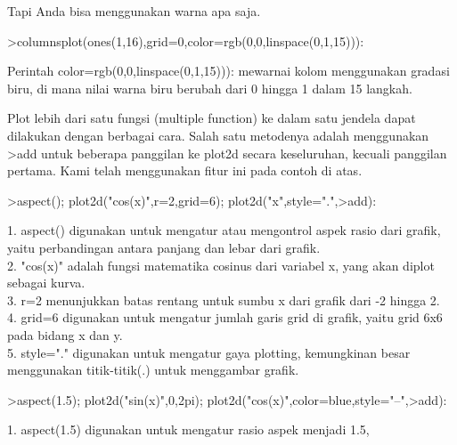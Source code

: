 \documentclass{article}
\begin{document}
\begin{eulernotebook}
\begin{eulercomment}
\begin{eulercomment}
\begin{eulercomment}
\begin{eulercomment}
\begin{eulercomment}
\begin{eulercomment}
\begin{eulercomment}
\begin{eulercomment}
\begin{eulercomment}
Tapi Anda bisa menggunakan warna apa saja.
\end{eulercomment}
\begin{eulerprompt}
>columnsplot(ones(1,16),grid=0,color=rgb(0,0,linspace(0,1,15))):
\end{eulerprompt}
\begin{eulercomment}
Perintah color=rgb(0,0,linspace(0,1,15))): mewarnai kolom menggunakan
gradasi biru, di mana nilai warna biru berubah dari 0 hingga 1 dalam
15 langkah.

\begin{eulercomment}
\begin{eulercomment}
Plot lebih dari satu fungsi (multiple function) ke dalam satu jendela
dapat dilakukan dengan berbagai cara. Salah satu metodenya adalah
menggunakan \textgreater{}add untuk beberapa panggilan ke plot2d secara
keseluruhan, kecuali panggilan pertama. Kami telah menggunakan fitur
ini pada contoh di atas.
\end{eulercomment}
\begin{eulerprompt}
>aspect(); plot2d("cos(x)",r=2,grid=6); plot2d("x",style=".",>add):
\end{eulerprompt}
\begin{eulercomment}
1. aspect() digunakan untuk mengatur atau mengontrol aspek rasio dari
grafik, yaitu perbandingan antara panjang dan lebar dari grafik.\\
2. "cos(x)" adalah fungsi matematika cosinus dari variabel x, yang
akan diplot sebagai kurva.\\
3. r=2 menunjukkan batas rentang untuk sumbu x dari grafik dari -2
hingga 2.\\
4. grid=6 digunakan untuk mengatur jumlah garis grid di grafik, yaitu
grid 6x6 pada bidang x dan y.\\
5. style="." digunakan untuk mengatur gaya plotting, kemungkinan besar
menggunakan titik-titik(.) untuk menggambar grafik.
\end{eulercomment}
\begin{eulerprompt}
>aspect(1.5); plot2d("sin(x)",0,2pi); plot2d("cos(x)",color=blue,style="--",>add):
\end{eulerprompt}
\begin{eulercomment}
1. aspect(1.5) digunakan untuk mengatur rasio aspek menjadi 1.5,

\end{eulercomment}
\end{eulercomment}
\end{eulercomment}
\end{eulercomment}
\end{eulercomment}
\end{eulercomment}
\end{eulercomment}
\end{eulercomment}
\end{eulercomment}
\end{eulercomment}
\end{eulercomment}
\end{eulernotebook}
\end{document}
